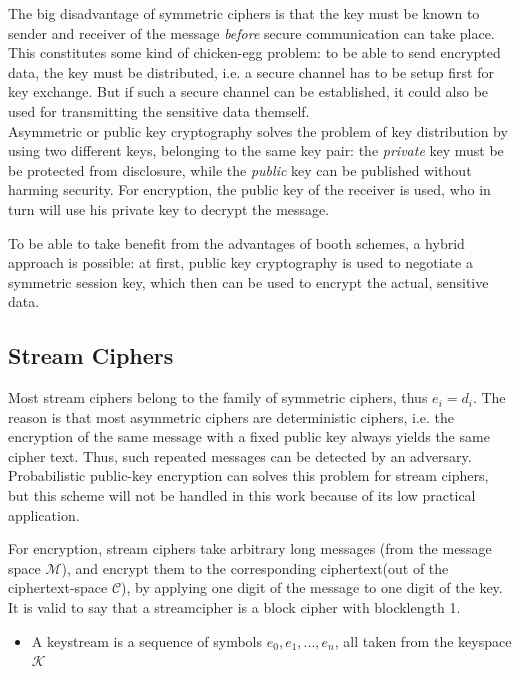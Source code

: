 The big disadvantage of symmetric ciphers is that the key must be known to sender
and receiver of the message \textit{before} secure communication can take place. This constitutes some kind of chicken-egg problem: to be able to send encrypted
data, the key must be distributed, i.e. a secure channel has to be setup first for key exchange. But if such a secure channel can be established, it could also be used
for transmitting the sensitive data themself.
\\

Asymmetric or public key cryptography solves the problem of key distribution by using two different keys, belonging to the same key pair: the \textit{private}
key must be be protected from disclosure, while the \textit{public} key can be published without harming security. For encryption, the public key of the receiver
is used, who in turn will use his private key to decrypt the message. 

To be able to take benefit from the advantages of booth schemes, a hybrid approach is possible: at first, public key cryptography is used to negotiate a symmetric session
key, which then can be used to encrypt the actual, sensitive data.

\subsection{Stream Ciphers}

Most stream ciphers belong to the family of symmetric ciphers, thus $e_i = d_i$. The reason is that most asymmetric ciphers are deterministic ciphers,
i.e. the encryption of the same message with a fixed public key always yields the same cipher text. Thus, such repeated messages can be detected by 
an adversary. 
Probabilistic public-key encryption can solves this problem for stream ciphers,
but this scheme will not be handled in this work because of its low practical application.

For encryption, stream ciphers take arbitrary long messages (from the message space $\mathcal{M}$), and encrypt
them to the corresponding ciphertext(out of the ciphertext-space $\mathcal{C}$), by applying
one digit of the message to one digit of the key. It is valid to say that a streamcipher is a block cipher with blocklength 1.

\begin{itemize}
 \item A keystream is a sequence of symbols $e_0, e_1, ..., e_n$, all taken from the keyspace $\mathcal{K}$
\end{itemize}

